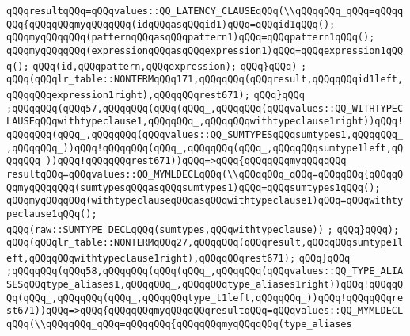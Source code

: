 \verb|qQQqresultqQQq=qQQqvalues::QQ_LATENCY_CLAUSEqQQq(\\qQQqqQQq_qQQq=qQQqqQQq{qQQqqQQqmyqQQqqQQq(idqQQqasqQQqid1)qQQq=qQQqid1qQQq();|\newline
\verb|qQQqmyqQQqqQQq(patternqQQqasqQQqpattern1)qQQq=qQQqpattern1qQQq();|\newline
\verb|qQQqmyqQQqqQQq(expressionqQQqasqQQqexpression1)qQQq=qQQqexpression1qQQq();|\newline
\verb|qQQq(id,qQQqpattern,qQQqexpression);|\newline
\verb|qQQq}qQQq)|\newline
\verb|;|\newline
\verb|qQQq(qQQqlr_table::NONTERMqQQq171,qQQqqQQq(qQQqresult,qQQqqQQqid1left,qQQqqQQqexpression1right),qQQqqQQqrest671);|\newline
\verb|qQQq}qQQq|\newline
\verb|;qQQqqQQq(qQQq57,qQQqqQQq(qQQq(qQQq_,qQQqqQQq(qQQqvalues::QQ_WITHTYPECLAUSEqQQqwithtypeclause1,qQQqqQQq_,qQQqqQQqwithtypeclause1right))qQQq!qQQqqQQq(qQQq_,qQQqqQQq(qQQqvalues::QQ_SUMTYPESqQQqsumtypes1,qQQqqQQq_,qQQqqQQq_))qQQq!qQQqqQQq(qQQq_,qQQqqQQq(qQQq_,qQQqqQQqsumtype1left,qQQqqQQq_))qQQq!qQQqqQQqrest671))qQQq=>qQQq{qQQqqQQqmyqQQqqQQq|\newline
\verb|resultqQQq=qQQqvalues::QQ_MYMLDECLqQQq(\\qQQqqQQq_qQQq=qQQqqQQq{qQQqqQQqmyqQQqqQQq(sumtypesqQQqasqQQqsumtypes1)qQQq=qQQqsumtypes1qQQq();|\newline
\verb|qQQqmyqQQqqQQq(withtypeclauseqQQqasqQQqwithtypeclause1)qQQq=qQQqwithtypeclause1qQQq();|\newline
\verb|qQQq(raw::SUMTYPE_DECLqQQq(sumtypes,qQQqwithtypeclause))|\newline
\verb|;|\newline
\verb|qQQq}qQQq);|\newline
\verb|qQQq(qQQqlr_table::NONTERMqQQq27,qQQqqQQq(qQQqresult,qQQqqQQqsumtype1left,qQQqqQQqwithtypeclause1right),qQQqqQQqrest671);|\newline
\verb|qQQq}qQQq|\newline
\verb|;qQQqqQQq(qQQq58,qQQqqQQq(qQQq(qQQq_,qQQqqQQq(qQQqvalues::QQ_TYPE_ALIASESqQQqtype_aliases1,qQQqqQQq_,qQQqqQQqtype_aliases1right))qQQq!qQQqqQQq(qQQq_,qQQqqQQq(qQQq_,qQQqqQQqtype_t1left,qQQqqQQq_))qQQq!qQQqqQQqrest671))qQQq=>qQQq{qQQqqQQqmyqQQqqQQqresultqQQq=qQQqvalues::QQ_MYMLDECLqQQq(\\qQQqqQQq_qQQq=qQQqqQQq{qQQqqQQqmyqQQqqQQq(type_aliases|\newline
